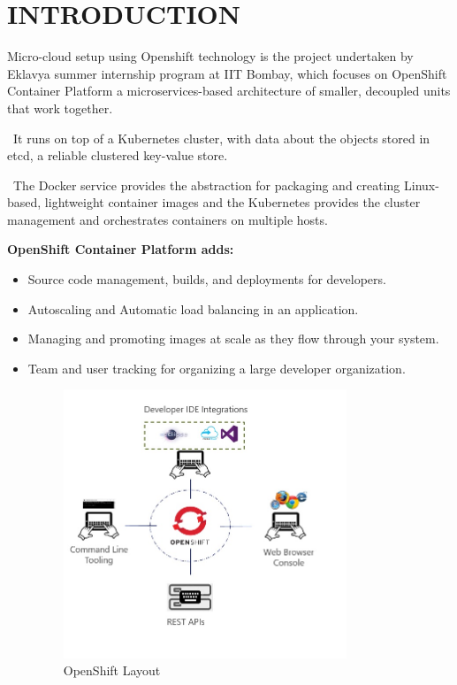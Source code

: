 \documentclass[11pt]{report}
\begin{document}
	\chapter{INTRODUCTION}
	\large
	Micro-cloud setup using Openshift technology is the project undertaken by Eklavya summer internship program at IIT Bombay, which focuses on OpenShift Container Platform a microservices-based architecture of smaller, decoupled units that work together.
	\
	
	\
	It runs on top of a Kubernetes cluster, with data about the objects stored in etcd, a reliable clustered key-value store.
	\
	
	\
	The Docker service provides the abstraction for packaging and creating Linux-based, lightweight container images and the Kubernetes provides the cluster management and orchestrates containers on multiple hosts.
	
	\textbf { OpenShift Container Platform adds:}
	\begin{itemize}
		\large
		\item Source code management, builds, and deployments for developers.
		\item Autoscaling and Automatic load balancing in an application.
		\item Managing and promoting images at scale as they flow through your system.
		\item Team and user tracking for organizing a large developer organization.
		\begin{figure}[h!]
    	\begin{center}
    		\includegraphics[width=0.80\textwidth, totalheight=0.30\textheight]{intro.png}
    		\caption{OpenShift Layout \cite{intro}}
    	  \end{center}
	  
		\end{figure}
		
		
	\end{itemize}
	\large
	\pagebreak
\end{document}
